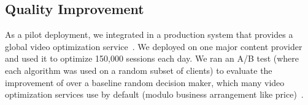 


\subsection{Quality Improvement}
\label{subsec:eval-improvement}



As a pilot deployment, we integrated \dda in a production 
system that provides a global video optimization 
service~\cite{c3}.
We deployed \dda on one major content provider and used it 
 to optimize 150,000 sessions each day.
We ran an A/B test (where each algorithm was used on 
a random subset of clients) to  evaluate the improvement 
of \dda over a baseline random decision maker, which 
many video optimization services  use by default (modulo 
business arrangement like price)~\cite{hulu}.



